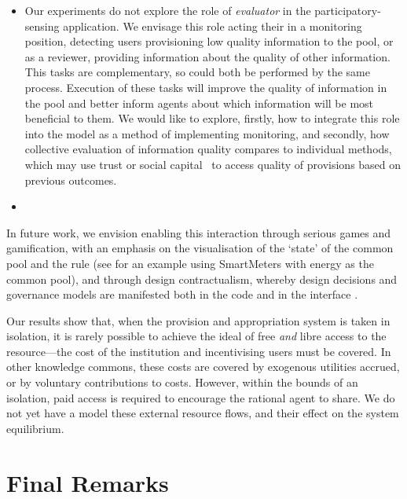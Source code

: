\begin{itemize}
\item Our experiments do not explore the role of \emph{evaluator} in the participatory-sensing application. We envisage this role acting their in a monitoring position, detecting users provisioning low quality information to the pool, or as a reviewer, providing information about the quality of other information. This tasks are complementary, so could both be performed by the same process. Execution of these tasks will improve the quality of information in the pool and better inform agents about which information will be most beneficial to them. We would like to explore, firstly, how to integrate this role into the model as a method of implementing monitoring, and secondly, how collective evaluation of information quality compares to individual methods, which may use trust or social capital~\citep{Petruzzi2014} to access quality of provisions based on previous outcomes.
\item 
\end{itemize}

In future work, we envision enabling this interaction through
serious games and gamification, with an emphasis on the visualisation of the `state' of the common pool and the rule
(see  for an example using SmartMeters with energy as the common pool), and through
design contractualism, whereby design decisions and governance models are manifested both in the code and in the interface
\cite{Pitt12}.

Our results show that, when the provision and appropriation system is taken in
isolation, it is rarely possible to achieve the ideal of free \emph{and} libre
access to the resource---the cost of the institution and incentivising users
must be covered. In other knowledge commons, these costs are covered by
exogenous utilities accrued, or by voluntary contributions to costs. However,
within the bounds of an isolation, paid access is required to encourage the
rational agent to share. We do not yet have a model these external resource
flows, and their effect on the system equilibrium.

\section{Final Remarks}
